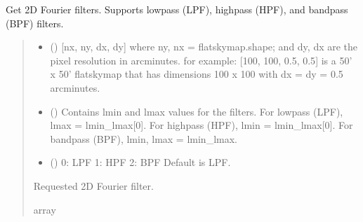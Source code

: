 \documentclass[letterpaper,10pt,english]{sphinxmanual}
\begin{document}

\begin{fulllineitems}
\label{\detokenize{flatsky:flatsky.get_lpf_hpf}}
\pysigstartsignatures
{}
\pysigstopsignatures
\sphinxAtStartPar
Get 2D Fourier filters. Supports low\sphinxhyphen{}pass (LPF), high\sphinxhyphen{}pass (HPF), and band\sphinxhyphen{}pass (BPF) filters.
\begin{quote}\begin{description}
\begin{itemize}
\item {} 
\sphinxAtStartPar
{} () \textendash{} {[}nx, ny, dx, dy{]} where ny, nx = flatskymap.shape; and dy, dx are the pixel resolution in arcminutes.
for example: {[}100, 100, 0.5, 0.5{]} is a 50’ x 50’ flatskymap that has dimensions 100 x 100 with dx = dy = 0.5 arcminutes.

\item {} 
\sphinxAtStartPar
{} () \textendash{} Contains lmin and lmax values for the filters.
For low\sphinxhyphen{}pass (LPF), lmax = lmin\_lmax{[}0{]}.
For high\sphinxhyphen{}pass (HPF), lmin = lmin\_lmax{[}0{]}.
For band\sphinxhyphen{}pass (BPF), lmin, lmax = lmin\_lmax.

\item {} 
\sphinxAtStartPar
{} () \textendash{} 0: LPF
1: HPF
2: BPF
Default is LPF.

\end{itemize}

\sphinxAtStartPar
{} \textendash{} Requested 2D Fourier filter.

\sphinxAtStartPar
array

\end{description}\end{quote}

\end{fulllineitems}
\end{document}
